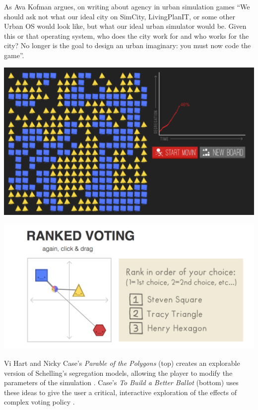 \documentclass[nofonts,nols,justified,nobib]{tufte-book}
\begin{document}
As Ava Kofman argues, on writing about agency in urban simulation games ``We should ask not what our ideal city on SimCity, LivingPlanIT, or some other Urban OS would look like, but what our ideal urban simulator would be. Given this or that operating system, who does the city work for and who works for the city? No longer is the goal to design an urban imaginary: you must now code the game''.

\begin{marginfigure}
\includegraphics[width=\textwidth]{img/1/parable.png}

\vspace{0.2cm}

\includegraphics[width=\textwidth]{img/1/voting.png}
\caption{Vi Hart and Nicky Case's \emph{Parable of the Polygons} (top) creates an explorable version of Schelling's segregation models, allowing the player to modify the parameters of the simulation \cite{case_parable_2015}. Case's \emph{To Build a Better Ballot} (bottom) uses these ideas to give the user a critical, interactive exploration of the effects of complex voting policy \cite{case_build_2016}.}
\end{marginfigure}
\end{document}
